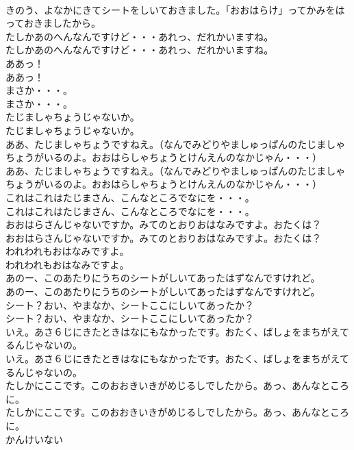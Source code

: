 \documentclass[8pt]{extreport}
\begin{document}
\begin{CJK}{UTF8}{min}
\\	きのう、よなかにきてシートをしいておきました。「おおはらけ」ってかみをはっておきましたから。 
\\	たしかあのへんなんですけど・・・あれっ、だれかいますね。	
\\	たしかあのへんなんですけど・・・あれっ、だれかいますね。 
\\	ああっ！	
\\	ああっ！ 
\\	まさか・・・。	
\\	まさか・・・。 
\\	たじましゃちょうじゃないか。	
\\	たじましゃちょうじゃないか。 
\\	ああ、たじましゃちょうですねえ。（なんでみどりやましゅっぱんのたじましゃちょうがいるのよ。おおはらしゃちょうとけんえんのなかじゃん・・・）	
\\	ああ、たじましゃちょうですねえ。（なんでみどりやましゅっぱんのたじましゃちょうがいるのよ。おおはらしゃちょうとけんえんのなかじゃん・・・） 
\\	これはこれはたじまさん、こんなところでなにを・・・。	
\\	これはこれはたじまさん、こんなところでなにを・・・。 
\\	おおはらさんじゃないですか。みてのとおりおはなみですよ。おたくは？	
\\	おおはらさんじゃないですか。みてのとおりおはなみですよ。おたくは？ 
\\	われわれもおはなみですよ。	
\\	われわれもおはなみですよ。 
\\	あのー、このあたりにうちのシートがしいてあったはずなんですけれど。	
\\	あのー、このあたりにうちのシートがしいてあったはずなんですけれど。 
\\	シート？おい、やまなか、シートここにしいてあったか？	
\\	シート？おい、やまなか、シートここにしいてあったか？ 
\\	いえ。あさ６じにきたときはなにもなかったです。おたく、ばしょをまちがえてるんじゃないの。	
\\	いえ。あさ６じにきたときはなにもなかったです。おたく、ばしょをまちがえてるんじゃないの。 
\\	たしかにここです。このおおきいきがめじるしでしたから。あっ、あんなところに。	
\\	たしかにここです。このおおきいきがめじるしでしたから。あっ、あんなところに。 
\\	かんけいない

\end{CJK}
\end{document}
